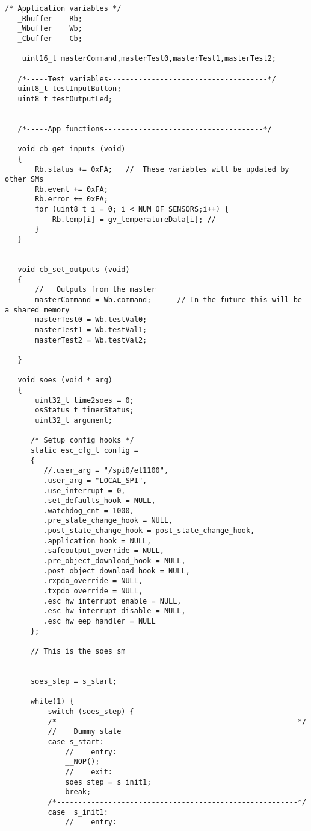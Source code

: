 \begin{lstlisting}[label=lst:soesAPP,caption={Main source code for SOES APP DSM.}]
   /* Application variables */
   _Rbuffer    Rb;
   _Wbuffer    Wb;
   _Cbuffer    Cb;
   
    uint16_t masterCommand,masterTest0,masterTest1,masterTest2;
   
   /*-----Test variables-------------------------------------*/
   uint8_t testInputButton;
   uint8_t testOutputLed;
   
   
   /*-----App functions-------------------------------------*/
   
   void cb_get_inputs (void)
   {
       Rb.status += 0xFA;	//	These variables will be updated by other SMs
       Rb.event += 0xFA;
       Rb.error += 0xFA;
       for (uint8_t i = 0; i < NUM_OF_SENSORS;i++) {
           Rb.temp[i] = gv_temperatureData[i]; //
       }
   }
   
   
   void cb_set_outputs (void)
   {
       //	Outputs from the master
       masterCommand = Wb.command;		// In the future this will be a shared memory
       masterTest0 = Wb.testVal0;
       masterTest1 = Wb.testVal1;
       masterTest2 = Wb.testVal2;
   
   }
   
   void soes (void * arg)
   {
       uint32_t time2soes = 0;
       osStatus_t timerStatus;
       uint32_t argument;
   
      /* Setup config hooks */
      static esc_cfg_t config =
      {
         //.user_arg = "/spi0/et1100",
         .user_arg = "LOCAL_SPI",
         .use_interrupt = 0,
         .set_defaults_hook = NULL,
         .watchdog_cnt = 1000,
         .pre_state_change_hook = NULL,
         .post_state_change_hook = post_state_change_hook,
         .application_hook = NULL,
         .safeoutput_override = NULL,
         .pre_object_download_hook = NULL,
         .post_object_download_hook = NULL,
         .rxpdo_override = NULL,
         .txpdo_override = NULL,
         .esc_hw_interrupt_enable = NULL,
         .esc_hw_interrupt_disable = NULL,
         .esc_hw_eep_handler = NULL
      };
   
      // This is the soes sm
   
   
      soes_step = s_start;
   
      while(1) {
          switch (soes_step) {
          /*--------------------------------------------------------*/
          //	Dummy state
          case s_start:
              //	entry:
              __NOP();
              //	exit:
              soes_step = s_init1;
              break;
          /*--------------------------------------------------------*/
          case  s_init1:
              //	entry:
   

\end{lstlisting}
